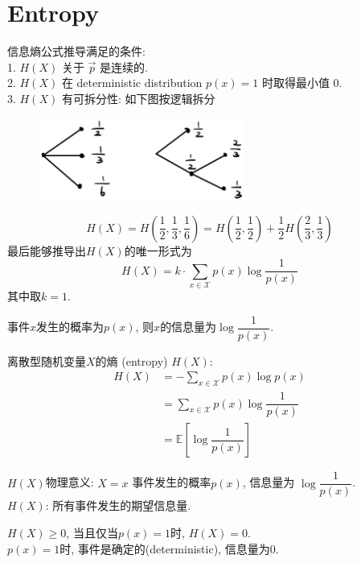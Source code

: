 \section{Entropy}

信息熵公式推导满足的条件: \\
1. $H(X)$ 关于 $\vec{p}$ 是连续的. \\
2. $H(X)$ 在 deterministic distribution $p(x)=1$ 时取得最小值 $0$. \\
3. $H(X)$ 有可拆分性: 如下图按逻辑拆分
\begin{figure}[htbp]
    \centering
    \includegraphics[width=0.6\textwidth]{./figures/chapter1/entropy_deduction.png}
\end{figure}
$$H(X)=H\left(\dfrac{1}{2},\dfrac{1}{3},\dfrac{1}{6}\right)=H\left(\dfrac{1}{2},\dfrac{1}{2}\right)+\dfrac{1}{2}H\left(\dfrac{2}{3},\dfrac{1}{3}\right)$$
最后能够推导出$H(X)$的唯一形式为
$$H(X)=k\cdot \sum_{x\in\mathcal{X}}p(x)\log\dfrac{1}{p(x)}$$
其中取$k=1$.

\begin{definition}
事件$x$发生的概率为$p(x)$, 则$x$的信息量为$\log\dfrac{1}{p(x)}$.
\end{definition}

\begin{definition}
离散型随机变量$X$的熵 (entropy) $H(X)$:
\begin{align*}
    H(X)&= -\sum_{x\in\mathcal{X}}p(x)\log p(x) \\
        &= \sum_{x\in\mathcal{X}}p(x)\log\dfrac{1}{p(x)} \\
        &= \mathbb{E}\left[\log\dfrac{1}{p(x)}\right]
\end{align*}
\end{definition}

$H(X)$物理意义: $X=x$ 事件发生的概率$p(x)$, 信息量为 $\log\dfrac{1}{p(x)}$. \\
$H(X)$: 所有事件发生的期望信息量.

\begin{proposition}
$H(X)\geq 0$, 当且仅当$p(x)=1$时, $H(X)=0$.\\
$p(x)=1$时, 事件是确定的(deterministic), 信息量为0.
\end{proposition}

